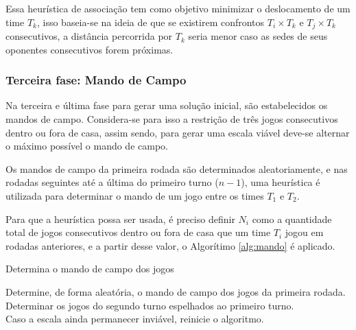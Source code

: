 \documentclass[12pt,a4paper]{article}
\makeatletter
\newcommand{\algorithmfootnote}[2][\footnotesize]{%
	\let\old@algocf@finish\@algocf@finish%
	\def\@algocf@finish{\old@algocf@finish%
		\leavevmode\rlap{\begin{minipage}{\linewidth}
				#1#2
		\end{minipage}}%
	}%
}
\numberwithin{figure}{section}
\numberwithin{table}{section}
\makeatother
\begin{document}
Essa heurística de associação tem como objetivo minimizar o deslocamento de um time $T_{k}$, isso baseia-se na ideia de que se existirem confrontos $T_{i} \times T_{k}$ e $T_{j} \times T_{k}$ consecutivos, a distância percorrida por $T_{k}$ seria menor caso as sedes de seus oponentes consecutivos forem próximas.

\subsubsection{Terceira fase: Mando de Campo}

Na terceira e última fase para gerar uma solução inicial, são estabelecidos os mandos de campo. Considera-se para isso a restrição de três jogos consecutivos dentro ou fora de casa, assim sendo, para gerar uma escala viável deve-se alternar o máximo possível o mando de campo.

Os mandos de campo da primeira rodada são determinados aleatoriamente, e nas rodadas seguintes até a última do primeiro turno ($n-1$), uma heurística é utilizada para determinar o mando de um jogo entre os times $T_{1}$ e $T_{2}$.

Para que a heurística possa ser usada, é preciso definir $N_{i}$ como a quantidade total de jogos consecutivos dentro ou fora de casa que um time $T_{i}$ jogou em rodadas anteriores, e a partir desse valor, o Algorítimo \ref{alg:mando} é aplicado.

\vspace{0.5cm}
\begin{algorithm}[H]
	\caption{Determina o mando de campo dos jogos}
	\algorithmfootnote{Fonte: \citeauthor{marcio:jogos}}
	\label{alg:mando}
	Determine, de forma aleatória, o mando de campo dos jogos da primeira rodada.\\
	Determinar os jogos do segundo turno espelhados ao primeiro turno.\\
	Caso a escala ainda permanecer inviável, reinicie o algoritmo.
\end{algorithm}
\vspace{0.5cm}
\end{document}
